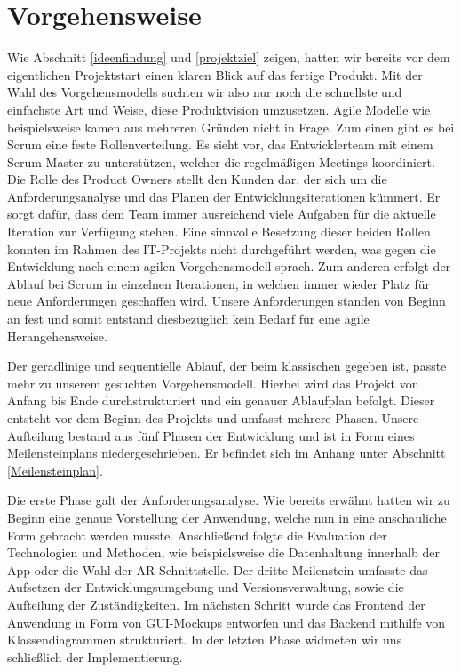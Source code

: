 \section{Vorgehensweise}
Wie Abschnitt \ref{ideenfindung} und \ref{projektziel} zeigen, hatten wir bereits vor dem eigentlichen Projektstart einen klaren Blick auf das fertige Produkt.
Mit der Wahl des Vorgehensmodells suchten wir also nur noch die schnellste und einfachste Art und Weise, diese Produktvision umzusetzen. 
Agile Modelle wie beispielsweise  kamen aus mehreren Gründen nicht in Frage. 
Zum einen gibt es bei Scrum eine feste Rollenverteilung. 
Es sieht vor, das Entwicklerteam mit einem Scrum-Master zu unterstützen, welcher die regelmäßigen Meetings koordiniert. 
Die Rolle des Product Owners stellt den Kunden dar, der sich um die Anforderungsanalyse und das Planen der Entwicklungsiterationen kümmert. 
Er sorgt dafür, dass dem Team immer ausreichend viele Aufgaben für die aktuelle Iteration zur Verfügung stehen. 
Eine sinnvolle Besetzung dieser beiden Rollen konnten im Rahmen des IT-Projekts nicht durchgeführt werden, was gegen die Entwicklung nach einem agilen Vorgehensmodell sprach.
Zum anderen erfolgt der Ablauf bei Scrum in einzelnen Iterationen, in welchen immer wieder Platz für neue Anforderungen geschaffen wird. 
Unsere Anforderungen standen von Beginn an fest und somit entstand diesbezüglich kein Bedarf für eine agile Herangehensweise.

Der geradlinige und sequentielle Ablauf, der beim klassischen  gegeben ist, passte mehr zu unserem gesuchten Vorgehensmodell.
Hierbei wird das Projekt von Anfang bis Ende durchstrukturiert und ein genauer Ablaufplan befolgt.
Dieser entsteht vor dem Beginn des Projekts und umfasst mehrere Phasen. 
Unsere Aufteilung bestand aus fünf Phasen der Entwicklung und ist in Form eines Meilensteinplans niedergeschrieben. Er befindet sich im Anhang unter Abschnitt \ref{Meilensteinplan}.

Die erste Phase galt der Anforderungsanalyse. 
Wie bereits erwähnt hatten wir zu Beginn eine genaue Vorstellung der Anwendung, welche nun in eine anschauliche Form gebracht werden musste. 
Anschließend folgte die Evaluation der Technologien und Methoden, wie beispielsweise die Datenhaltung innerhalb der App oder die Wahl der AR-Schnittstelle.
Der dritte Meilenstein umfasste das Aufsetzen der Entwicklungsumgebung und Versionsverwaltung, sowie die Aufteilung der Zuständigkeiten.
Im nächsten Schritt wurde das Frontend der Anwendung in Form von GUI-Mockups entworfen und das Backend mithilfe von Klassendiagrammen strukturiert.
In der letzten Phase widmeten wir uns schließlich der Implementierung.
